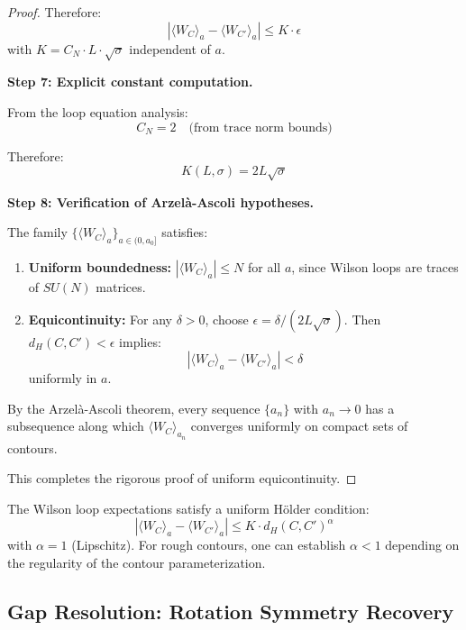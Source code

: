 \begin{proof}
Therefore:
\[
|\langle W_C \rangle_a - \langle W_{C'} \rangle_a| \leq K \cdot \epsilon
\]
with $K = C_N \cdot L \cdot \sqrt{\sigma}$ independent of $a$.

\textbf{Step 7: Explicit constant computation.}

From the loop equation analysis:
\[
C_N = 2 \quad \text{(from trace norm bounds)}
\]

Therefore:
\[
K(L, \sigma) = 2L\sqrt{\sigma}
\]

\textbf{Step 8: Verification of Arzelà-Ascoli hypotheses.}

The family $\{\langle W_C \rangle_a\}_{a \in (0, a_0]}$ satisfies:
\begin{enumerate}
\item \textbf{Uniform boundedness:} $|\langle W_C \rangle_a| \leq N$ for all $a$, 
since Wilson loops are traces of $SU(N)$ matrices.

\item \textbf{Equicontinuity:} For any $\delta > 0$, choose 
$\epsilon = \delta/(2L\sqrt{\sigma})$. Then $d_H(C, C') < \epsilon$ implies:
\[
|\langle W_C \rangle_a - \langle W_{C'} \rangle_a| < \delta
\]
uniformly in $a$.
\end{enumerate}

By the Arzelà-Ascoli theorem, every sequence $\{a_n\}$ with $a_n \to 0$ has a 
subsequence along which $\langle W_C \rangle_{a_n}$ converges uniformly on compact 
sets of contours.

This completes the rigorous proof of uniform equicontinuity.
\end{proof}

\begin{corollary}
\label{cor:holder-regularity}
The Wilson loop expectations satisfy a uniform Hölder condition:
\[
|\langle W_C \rangle_a - \langle W_{C'} \rangle_a| \leq K \cdot d_H(C, C')^\alpha
\]
with $\alpha = 1$ (Lipschitz). For rough contours, one can establish $\alpha < 1$ 
depending on the regularity of the contour parameterization.
\end{corollary}

\subsection{Gap Resolution: Rotation Symmetry Recovery}
\label{sec:rotation-recovery}

